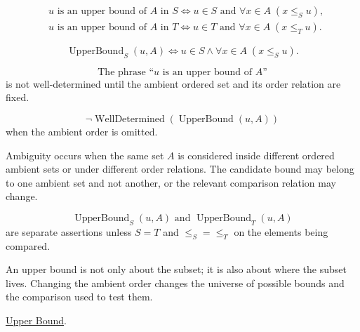 \begin{remark*}
\[
\begin{aligned}
&u\text{ is an upper bound of }A\text{ in }S
\Longleftrightarrow
u\in S\text{ and }\forall x\in A\;(x\le_S u),\\
&u\text{ is an upper bound of }A\text{ in }T
\Longleftrightarrow
u\in T\text{ and }\forall x\in A\;(x\le_T u).
\end{aligned}
\]
\end{remark*}

\begin{remark*}
\[
\operatorname{UpperBound}_S(u,A)
\Longleftrightarrow
u\in S\land \forall x\in A\;(x\le_S u).
\]
\end{remark*}

\begin{remark*}
\[
\text{The phrase ``}u\text{ is an upper bound of }A\text{''}
\]
is not well-determined until the ambient ordered set and its order relation are fixed.
\end{remark*}

\begin{remark*}
\[
\neg\operatorname{WellDetermined}(\operatorname{UpperBound}(u,A))
\]
when the ambient order is omitted.
\end{remark*}

\begin{remark*}
Ambiguity occurs when the same set $A$ is considered inside different ordered ambient sets or under different order relations. The candidate bound may belong to one ambient set and not another, or the relevant comparison relation may change.
\end{remark*}

\begin{remark*}
\[
\operatorname{UpperBound}_S(u,A)
\text{ and }
\operatorname{UpperBound}_T(u,A)
\]
are separate assertions unless $S=T$ and $\le_S=\le_T$ on the elements being compared.
\end{remark*}

\begin{remark*}[Interpretation]
An upper bound is not only about the subset; it is also about where the subset lives. Changing the ambient order changes the universe of possible bounds and the comparison used to test them.
\end{remark*}

\begin{remark*}[Dependencies]
\hyperref[def:upper-bound]{Upper Bound}.
\end{remark*}


